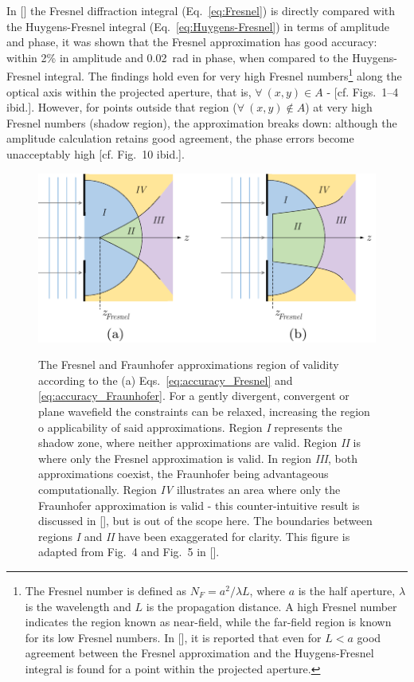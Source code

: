 \begin{refsection}
In [\cite{Southwell1981}] the Fresnel diffraction integral (Eq.~\ref{eq:Fresnel}) is directly compared with the Huygens-Fresnel integral (Eq.~\ref{eq:Huygens-Fresnel}) in terms of amplitude and phase, it was shown that the Fresnel approximation has good accuracy: within 2\% in amplitude and 0.02~rad in phase, when compared to the Huygens-Fresnel integral. The findings hold even for very high Fresnel numbers\footnote{The Fresnel number is defined as $N_F=a^2/\lambda L$, where $a$ is the half aperture, $\lambda$ is the wavelength and $L$ is the propagation distance. A high Fresnel number indicates the region known as near-field, while the far-field region is known for its low Fresnel numbers. In [\cite{Southwell1981}], it is reported that even for $L<a$ good agreement between the Fresnel approximation and the Huygens-Fresnel integral is found for a point within the projected aperture.} along the optical axis within the projected aperture, that is, $\forall~(x,y) \in A$ - [cf. Figs.~1--4 ibid.]. However, for points outside that region ($\forall~(x,y) \notin A$) at very high Fresnel numbers (shadow region), the approximation breaks down: although the amplitude calculation retains good agreement, the phase errors become unacceptably high [cf. Fig.~10 ibid.]. 

\begin{figure}[t]
    \centering
    {\includegraphics[width=0.6\linewidth]{figures/ch02/Fresnel.pdf}}
    \caption[The validity of the Fresnel approximation]{The Fresnel and Fraunhofer approximations region of validity according to the (a) Eqs.~\ref{eq:accuracy_Fresnel} and \ref{eq:accuracy_Fraunhofer}. For a gently divergent, convergent or plane wavefield the constraints can be relaxed, increasing the region o applicability of said approximations. Region \textit{I} represents the shadow zone, where neither approximations are valid. Region \textit{II} is where only the Fresnel approximation is valid. In region \textit{III}, both approximations coexist, the Fraunhofer being advantageous computationally. Region \textit{IV} illustrates an area where only the Fraunhofer approximation is valid - this counter-intuitive result is discussed in [\cite{Rees87}], but is out of the scope here. The boundaries between regions \textit{I} and \textit{II} have been exaggerated for clarity. This figure is adapted from Fig.~4 and Fig.~5 in [\cite{Rees87}].}
    \label{fig:validity_fresnel}
\end{figure}


\end{refsection}
